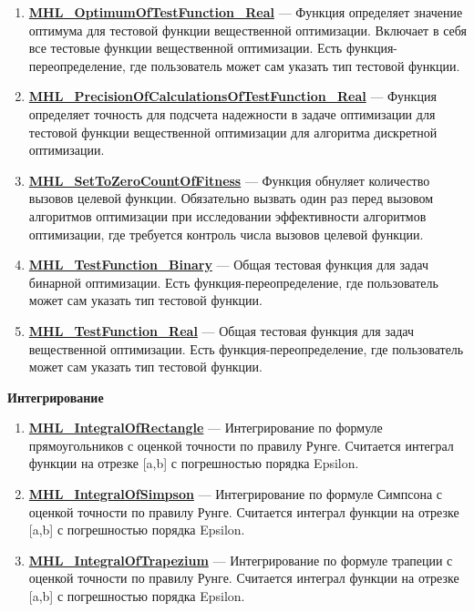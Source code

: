 \documentclass[a4paper,12pt]{article}
\begin{document}
\begin{enumerate}
\item \textbf{\hyperref[MHL_OptimumOfTestFunction_Real]{MHL\_OptimumOfTestFunction\_Real}} --- Функция определяет значение оптимума для тестовой функции вещественной оптимизации. Включает в себя все тестовые функции вещественной оптимизации. Есть функция-переопределение, где пользователь может сам указать тип тестовой функции.

\item \textbf{\hyperref[MHL_PrecisionOfCalculationsOfTestFunction_Real]{MHL\_PrecisionOfCalculationsOfTestFunction\_Real}} --- Функция определяет точность для подсчета надежности в задаче оптимизации для тестовой функции вещественной оптимизации для алгоритма дискретной оптимизации.

\item \textbf{\hyperref[MHL_SetToZeroCountOfFitness]{MHL\_SetToZeroCountOfFitness}} --- Функция обнуляет количество вызовов целевой функции. Обязательно вызвать один раз перед вызовом алгоритмов оптимизации при исследовании эффективности    алгоритмов оптимизации, где требуется контроль числа вызовов целевой функции.

\item \textbf{\hyperref[MHL_TestFunction_Binary]{MHL\_TestFunction\_Binary}} --- Общая тестовая функция для задач бинарной оптимизации. Есть функция-переопределение, где пользователь может сам указать тип тестовой функции.

\item \textbf{\hyperref[MHL_TestFunction_Real]{MHL\_TestFunction\_Real}} --- Общая тестовая функция для задач вещественной оптимизации. Есть функция-переопределение, где пользователь может сам указать тип тестовой функции.

\end{enumerate}

\textbf{Интегрирование}
\begin{enumerate}

\item \textbf{\hyperref[MHL_IntegralOfRectangle]{MHL\_IntegralOfRectangle}} --- Интегрирование по формуле прямоугольников с оценкой точности по правилу Рунге. Считается интеграл функции на отрезке [a,b] с погрешностью порядка Epsilon.

\item \textbf{\hyperref[MHL_IntegralOfSimpson]{MHL\_IntegralOfSimpson}} --- Интегрирование по формуле Симпсона с оценкой точности по правилу Рунге. Считается интеграл функции на отрезке [a,b] с погрешностью порядка Epsilon.

\item \textbf{\hyperref[MHL_IntegralOfTrapezium]{MHL\_IntegralOfTrapezium}} --- Интегрирование по формуле трапеции с оценкой точности по правилу Рунге. Считается интеграл функции на отрезке [a,b] с погрешностью порядка Epsilon.

\end{enumerate}
\end{document}
